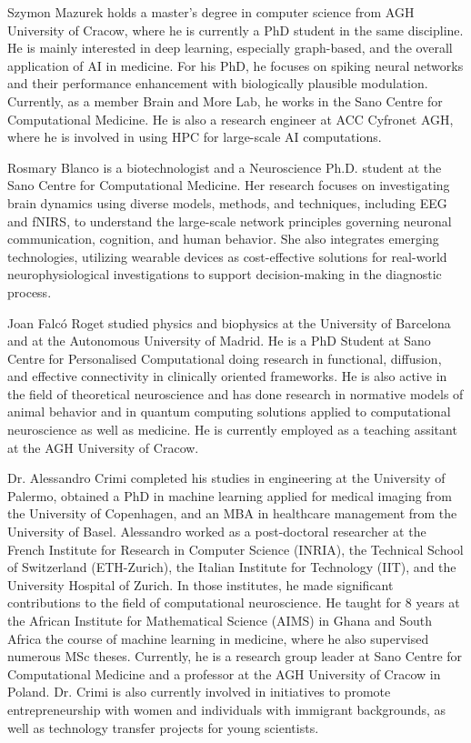 \documentclass[a4paper,fleqn]{cas-sc}
\begin{document}




Szymon Mazurek holds a master's degree in computer science from AGH University of Cracow, where he is currently a PhD student in the same discipline. He is mainly interested in deep learning, especially graph-based, and the overall application of AI in medicine. For his PhD, he focuses on spiking neural networks and their performance enhancement with biologically plausible modulation. Currently, as a member Brain and More Lab, he works in the Sano Centre for Computational Medicine. He is also a research engineer at ACC Cyfronet AGH, where he is involved in using HPC for large-scale AI computations.
\endbio

Rosmary Blanco is a biotechnologist and a Neuroscience Ph.D. student at the Sano Centre for Computational Medicine. Her research focuses on investigating brain dynamics using diverse models, methods, and techniques, including EEG and fNIRS, to understand the large-scale network principles governing neuronal communication, cognition, and human behavior. She also integrates emerging technologies, utilizing wearable devices as cost-effective solutions for real-world neurophysiological investigations to support decision-making in the diagnostic process.
\endbio

Joan Falc\'o Roget studied physics and biophysics at the University of Barcelona and at the Autonomous University of Madrid. He is a PhD Student at Sano Centre for Personalised Computational doing research in functional, diffusion, and effective connectivity in clinically oriented frameworks. He is also active in the field of theoretical neuroscience and has done research in normative models of animal behavior and in quantum computing solutions applied to computational neuroscience as well as medicine. He is currently employed as a teaching assitant at the AGH University of Cracow.
\endbio

Dr. Alessandro Crimi completed his studies in engineering at the University of Palermo,  obtained a PhD in machine learning applied for medical imaging from the University of Copenhagen,  and an MBA in healthcare management from the University of Basel.   
Alessandro worked as a post-doctoral researcher at the French Institute for Research in Computer Science (INRIA), the Technical School of Switzerland (ETH-Zurich), the Italian Institute for Technology (IIT), and the University Hospital of Zurich. In those institutes, he made significant contributions to the field of computational neuroscience. He taught for 8 years at the African Institute for Mathematical Science (AIMS) in Ghana and South Africa the course of machine learning in medicine, where he also supervised numerous MSc theses. Currently, he is a research group leader at Sano Centre for Computational Medicine and a professor at the AGH University of Cracow in Poland. Dr. Crimi is also currently involved in initiatives to promote entrepreneurship with women and individuals with immigrant backgrounds, as well as technology transfer projects for young scientists.
\endbio
\end{document}

